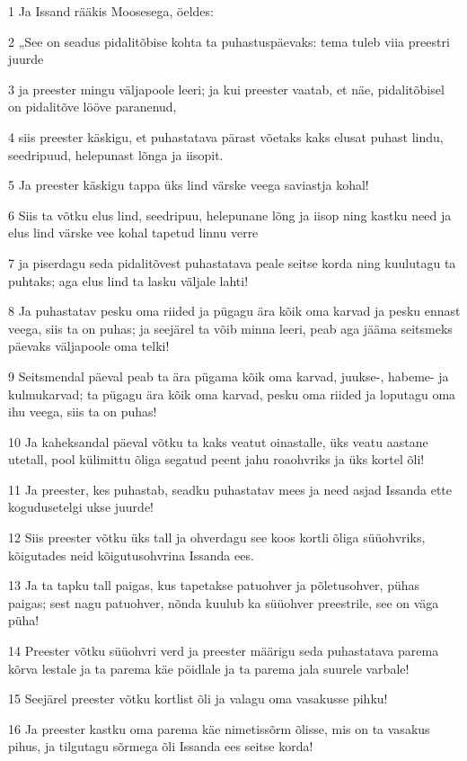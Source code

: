 \par 1 Ja Issand rääkis Moosesega, öeldes:
\par 2 „See on seadus pidalitõbise kohta ta puhastuspäevaks: tema tuleb viia preestri juurde
\par 3 ja preester mingu väljapoole leeri; ja kui preester vaatab, et näe, pidalitõbisel on pidalitõve lööve paranenud,
\par 4 siis preester käskigu, et puhastatava pärast võetaks kaks elusat puhast lindu, seedripuud, helepunast lõnga ja iisopit.
\par 5 Ja preester käskigu tappa üks lind värske veega saviastja kohal!
\par 6 Siis ta võtku elus lind, seedripuu, helepunane lõng ja iisop ning kastku need ja elus lind värske vee kohal tapetud linnu verre
\par 7 ja piserdagu seda pidalitõvest puhastatava peale seitse korda ning kuulutagu ta puhtaks; aga elus lind ta lasku väljale lahti!
\par 8 Ja puhastatav pesku oma riided ja pügagu ära kõik oma karvad ja pesku ennast veega, siis ta on puhas; ja seejärel ta võib minna leeri, peab aga jääma seitsmeks päevaks väljapoole oma telki!
\par 9 Seitsmendal päeval peab ta ära pügama kõik oma karvad, juukse-, habeme- ja kulmukarvad; ta pügagu ära kõik oma karvad, pesku oma riided ja loputagu oma ihu veega, siis ta on puhas!
\par 10 Ja kaheksandal päeval võtku ta kaks veatut oinastalle, üks veatu aastane utetall, pool külimittu õliga segatud peent jahu roaohvriks ja üks kortel õli!
\par 11 Ja preester, kes puhastab, seadku puhastatav mees ja need asjad Issanda ette kogudusetelgi ukse juurde!
\par 12 Siis preester võtku üks tall ja ohverdagu see koos kortli õliga süüohvriks, kõigutades neid kõigutusohvrina Issanda ees.
\par 13 Ja ta tapku tall paigas, kus tapetakse patuohver ja põletusohver, pühas paigas; sest nagu patuohver, nõnda kuulub ka süüohver preestrile, see on väga püha!
\par 14 Preester võtku süüohvri verd ja preester määrigu seda puhastatava parema kõrva lestale ja ta parema käe pöidlale ja ta parema jala suurele varbale!
\par 15 Seejärel preester võtku kortlist õli ja valagu oma vasakusse pihku!
\par 16 Ja preester kastku oma parema käe nimetissõrm õlisse, mis on ta vasakus pihus, ja tilgutagu sõrmega õli Issanda ees seitse korda!
